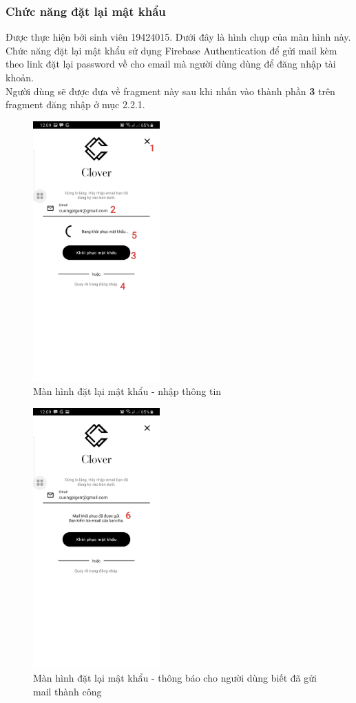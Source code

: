 \documentclass[12pt]{article}
\begin{document}
\subsubsection{Chức năng đặt lại mật khẩu}
Được thực hiện bởi sinh viên 19424015. Dưới đây là hình chụp của màn hình này.\\

\indent Chức năng đặt lại mật khẩu sử dụng Firebase Authentication để gửi mail kèm theo link đặt lại password về cho email mà người dùng dùng để đăng nhập tài khoản.\\

\indent Người dùng sẽ được đưa về fragment này sau khi nhấn vào thành phần \textbf{3} trên fragment đăng nhập ở mục 2.2.1.

\begin{figure}[H]
    \centering
    \includegraphics[height=10cm]{images/07.png}
    \caption{Màn hình đặt lại mật khẩu - nhập thông tin}
\end{figure}

\begin{figure}[H]
    \centering
    \includegraphics[height=10cm]{images/08.png}
    \caption{Màn hình đặt lại mật khẩu - thông báo cho người dùng biết đã gửi mail thành công}
\end{figure}
\end{document}
